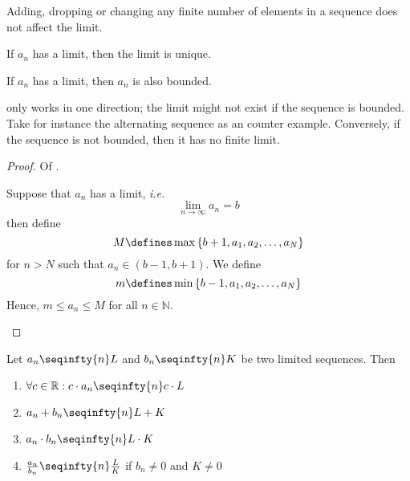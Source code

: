 \begin{rem}
	Adding, dropping or changing any finite number of elements in a sequence does
	not affect the limit.
\end{rem}

\begin{thm}\label{thm-sequence-unique-limit}
	If $a_n$ has a limit, then the limit is unique.
\end{thm}

\begin{thm}\label{thm-sequence-limit-bounded}
	If $a_n$ has a limit, then $a_n$ is also bounded.
\end{thm}

\begin{rem}\label{rem-sequence-limit-bounded}
	 only works in one direction; the
	limit might not exist if the sequence is bounded. Take for instance the alternating
	sequence as an counter example. Conversely, if the sequence is not bounded, then
	it has no finite limit.
\end{rem}

\begin{proof}
	Of .
	\begin{flushleft}
		Suppose that $a_n$ has a limit, \textit{i.e.}
		\begin{equation*}
			\lim_{n\to\infty}a_n=b
		\end{equation*}
		then define
		\begin{equation*}
			M\defines\max\left\{b+1,a_1,a_2,\dots,a_N\right\}
		\end{equation*}
		for $n>N$ such that $a_n\in(b-1,b+1)$. We define
		\begin{equation*}
			m\defines\min\left\{b-1,a_1,a_2,\dots,a_N\right\}
		\end{equation*}
		Hence, $m \leq a_n \leq M$ for all $n\in\mathbb{N}$.
	\end{flushleft}
\end{proof}

\begin{thm}\label{thm-sequence-arithmetic}
	Let $a_n \seqinfty{n} L$ and $b_n \seqinfty{n} K$ be two limited sequences. Then
	\begin{enumerate}
		\item $\forall c\in\mathbb{R}:c \cdot a_n \seqinfty{n} c \cdot L$
		\item $a_n+b_n \seqinfty{n} L+K$
		\item $a_n \cdot b_n \seqinfty{n} L \cdot K$
		\item $\tfrac{a_n}{b_n} \seqinfty{n} \tfrac{L}{K}$ if $b_n \neq 0$ and $K \neq 0$
	\end{enumerate}
\end{thm}

